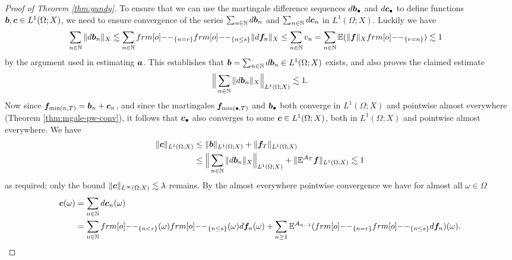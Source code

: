 \begin{proof}[Proof of Theorem \ref{thm:gundy}]
  To ensure that we can use the martingale difference sequences $d\bm{b}_{\bullet}$ and $d\bm{c}_{\bullet}$ to define functions $\bm{b}, \bm{c} \in L^1(\Omega;X)$, we need to ensure convergence of the series $\sum_{n \in \mathbb{N}} d\bm{b}_{n}$ and $\sum_{n \in \mathbb{N}} d\bm{c}_{n}$ in $L^1(\Omega;X)$.
  Luckily we have
  \begin{equation*}
    \begin{aligned}
    \sum_{n \in \N} \|d\mb{b}_{n}\|_{X} \lesssim \sum_{n \in \N} \1_{\{n = r\}} \1_{\{n \leq s\}} \|d\mb{f}_{n}\|_{X}
    &\leq \sum_{n \in \N} v_{n} = \sum_{n \in \N} \E(\|\mb{f}\|_{X} \1_{\{r = n\}}) \lesssim 1
  \end{aligned}
  \end{equation*}
  by the argument used in estimating $\bm{a}$.
  This establishes that $\bm{b} = \sum_{n \in \mathbb{N}} d\bm{b}_{n} \in L^1(\Omega;X)$ exists, and also proves the claimed estimate
  \begin{equation*}
    \Big\| \sum_{n \in \mathbb{N}} \|d\bm{b}_{n}\|_{X} \Big\|_{L^1(\Omega;X)} \lesssim 1.
  \end{equation*}
  Now since $\bm{f}_{\min(n,T)} = \bm{b}_{n} + \bm{c}_{n}$, and since the martingales $\bm{f}_{\min(\bullet,T)}$ and $\bm{b}_{\bullet}$ both converge in $L^1(\Omega;X)$ and pointwise almost everywhere (Theorem \ref{thm:mgale-pw-conv}), it follows that $\bm{c}_{\bullet}$ also converges to some $\bm{c} \in L^1(\Omega;X)$, both in $L^1(\Omega;X)$ and pointwise almost everywhere.
  We have
  \begin{equation*}
    \begin{aligned}
    \|\bm{c}\|_{L^1(\Omega;X)} &\leq \|\bm{b}\|_{L^1(\Omega;X)} + \|\bm{f}_{T}\|_{L^1(\Omega;X)} \\
    &\leq \Big\| \sum_{n \in \mathbb{N}} \|d\bm{b}_{n}\|_{X} \Big\|_{L^1(\Omega;X)} + \|\mathbb{E}^{\mathcal{A}_{T}} \bm{f}\|_{L^1(\Omega;X)}
    \lesssim 1
  \end{aligned}
  \end{equation*}
  as required; only the bound $\|\bm{c}\|_{L^\infty(\Omega;X)} \lesssim \lambda$ remains.
  By the almost everywhere pointwise convergence we have for almost all $\omega \in \Omega$
  \begin{equation*}
    \begin{aligned}
      \mb{c}(\omega)
      &= \sum_{n \in \N} d\mb{c}_{n}(\omega) \\
      &= \sum_{n \in \N} \1_{\{n < r\}}(\omega) \1_{\{n \leq s\}}(\omega) d\mb{f}_{n}(\omega)  + \sum_{n \geq 1} \E^{\mc{A}_{n-1}} (\1_{\{n = r\}} \1_{\{n \leq s\}} d\mb{f}_{n} )(\omega).

\end{aligned}
\end{equation*}
\end{proof}
